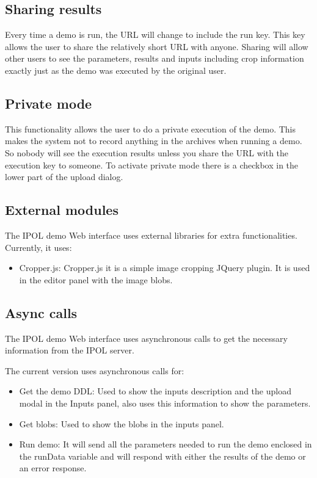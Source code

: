 
\subsection{Sharing results}
Every time a demo is run, the URL will change to include the run key. This key allows the user to share the relatively short URL 
with anyone. Sharing will allow other users to see the parameters, results and inputs including crop information exactly just as the 
demo was executed by the original user. 

\subsection{Private mode}
This functionality allows the user to do a private execution of the demo. This makes the system not to record anything in the archives when running 
a demo. So nobody will see the execution results unless you share the URL with the execution key to someone. To activate private 
mode there is a checkbox in the lower part of the upload dialog.

\subsection{External modules}

The IPOL demo Web interface uses external libraries for extra functionalities.
Currently, it uses:

\begin{itemize}
\item Cropper.js: Cropper.js it is a simple image cropping JQuery plugin. It is used in the editor panel with the image blobs.
\end{itemize}


\subsection{Async calls}
The IPOL demo Web interface uses asynchronous calls to get the necessary information from the IPOL server.

The current version uses asynchronous calls for:
\begin{itemize}
\item Get the demo DDL: Used to show the inputs description and the upload modal in the Inputs panel, also uses this information to show the parameters.
\item Get blobs: Used to show the blobs in the inputs panel.
\item Run demo: It will send all the parameters needed to run the demo enclosed in the runData variable and will respond with either the results of 
the demo or an error response.
\end{itemize}

